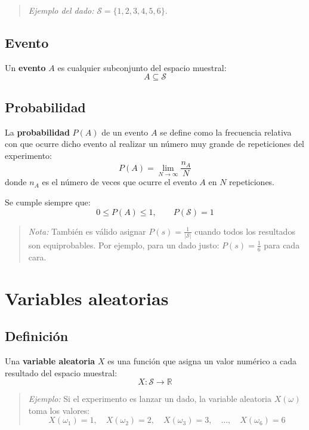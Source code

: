 \begin{quote}
\textit{Ejemplo del dado:} $\mathcal{S} = \{1, 2, 3, 4, 5, 6\}$.
\end{quote}

\subsection{Evento}

Un \textbf{evento} $A$ es cualquier subconjunto del espacio muestral:
$$
A \subseteq \mathcal{S}
$$

\subsection{Probabilidad}

La \textbf{probabilidad} $P(A)$ de un evento $A$ se define como la frecuencia relativa con que ocurre dicho evento al realizar un número muy grande de repeticiones del experimento:
$$
P(A) = \lim_{N \to \infty} \frac{n_A}{N}
$$
donde $n_A$ es el número de veces que ocurre el evento $A$ en $N$ repeticiones.

Se cumple siempre que:
$$
0 \leq P(A) \leq 1, \qquad P(\mathcal{S}) = 1
$$

\begin{quote}
\textit{Nota:} También es válido asignar $P(s) = \frac{1}{|\mathcal{S}|}$ cuando todos los resultados son equiprobables. Por ejemplo, para un dado justo: $P(s) = \frac{1}{6}$ para cada cara.
\end{quote}

\section{Variables aleatorias}

\subsection{Definición}

Una \textbf{variable aleatoria} $X$ es una función que asigna un valor numérico a cada resultado del espacio muestral:
$$
X: \mathcal{S} \longrightarrow \mathbb{R}
$$

\begin{quote}
\textit{Ejemplo:} Si el experimento es lanzar un dado, la variable aleatoria $X(\omega)$ toma los valores:
$$
X(\omega_1) = 1,\quad X(\omega_2) = 2,\quad X(\omega_3) = 3,\quad \ldots,\quad X(\omega_6) = 6
$$
\end{quote}

